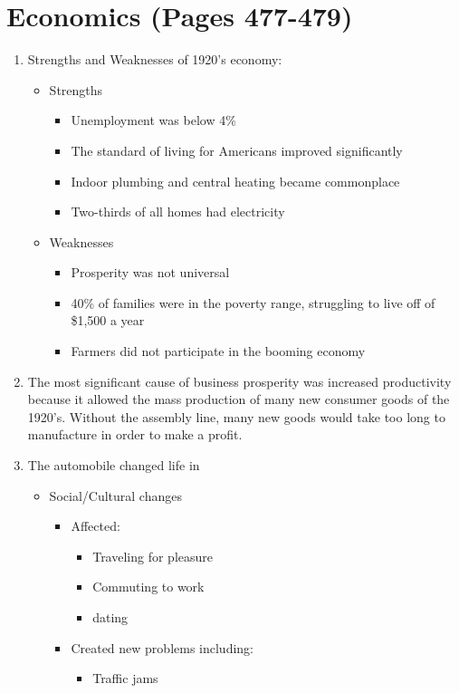 \documentclass[12pt]{article} %
\begin{document}
\section{Economics (Pages 477-479)}
\begin{enumerate}
	\item Strengths and Weaknesses of 1920's economy:
	\begin{itemize}
		\item Strengths
		\begin{itemize}
			\item Unemployment was below 4\%
			\item The standard of living for Americans improved significantly
			\item Indoor plumbing and central heating became commonplace
			\item Two-thirds of all homes had electricity
		\end{itemize}
		\item Weaknesses
		\begin{itemize}
			\item Prosperity was not universal
			\item 40\% of families were in the poverty range, struggling to live off of \$1,500 a year
			\item Farmers did not participate in the booming economy
		\end{itemize}
	\end{itemize}
	\item The most significant cause of business prosperity was increased productivity because it 
		allowed the mass production of many new consumer goods of the 1920's. Without the assembly line,
		many new goods would take too long to manufacture in order to make a profit.
	\item The automobile changed life in 
	\begin{itemize}
		\item Social/Cultural changes
		\begin{itemize}
			\item Affected: 
			\begin{itemize}
				\item Traveling for pleasure
				\item Commuting to work
				\item dating
			\end{itemize}
			\item Created new problems including:
			\begin{itemize}
				\item Traffic jams

\end{itemize}
\end{itemize}
\end{itemize}
\end{enumerate}
\end{document}
